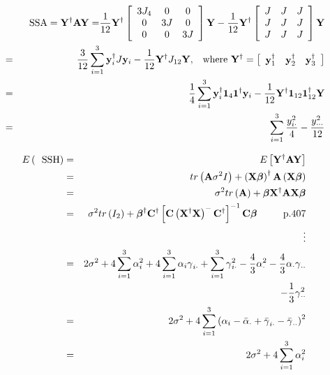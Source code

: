 \documentclass{article}
\begin{document}
\begin{eqnarray*}
&\therefore &\text{SSA}=\mathbf{Y}^{\dagger }\mathbf{AY=}\frac{1}{12}\mathbf{%
Y}^{\dagger }\left[ 
\begin{array}{ccc}
3J_{4} & 0 & 0 \\ 
0 & 3J & 0 \\ 
0 & 0 & 3J%
\end{array}%
\right] \mathbf{Y}-\frac{1}{12}\mathbf{Y}^{\dagger }\left[ 
\begin{array}{ccc}
J & J & J \\ 
J & J & J \\ 
J & J & J%
\end{array}%
\right] \mathbf{Y} \\
&=&\frac{3}{12}\sum\limits_{i=1}^{3}\mathbf{y}_{i}^{\dagger }J\mathbf{y}_{i}-%
\frac{1}{12}\mathbf{Y}^{\dagger }J_{12}\mathbf{Y,}\text{ where }\mathbf{Y}%
^{\dagger }=\left[ 
\begin{array}{ccc}
\mathbf{y}_{1}^{\dagger } & \mathbf{y}_{2}^{\dagger } & \mathbf{y}%
_{3}^{\dagger }%
\end{array}%
\right] \\
&=&\frac{1}{4}\sum\limits_{i=1}^{3}\mathbf{y}_{i}^{\dagger }\mathbf{1}_{4}%
\mathbf{1}^{\dagger }\mathbf{y}_{i}-\frac{1}{12}\mathbf{Y}^{\dagger }\mathbf{%
1}_{12}\mathbf{1}_{12}^{\dagger }\mathbf{Y} \\
&=&\sum\limits_{i=1}^{3}\frac{y_{i\cdot }^{2}}{4}-\frac{y_{\cdot \cdot \cdot
}^{2}}{12}
\end{eqnarray*}

\begin{eqnarray*}
E\left( \text{SSH}\right)  &=&E\left[ \mathbf{Y}^{\dagger }\mathbf{AY}\right]
\\
&=&tr\left( \mathbf{A}\sigma ^{2}I\right) +\left( \mathbf{X\beta }\right)
^{\dagger }\mathbf{A}\left( \mathbf{X\beta }\right)  \\
&=&\sigma ^{2}tr\left( \mathbf{A}\right) +\mathbf{\beta X^{\dagger }AX\beta }
\\
&=&\sigma ^{2}tr\left( I_{2}\right) +\mathbf{\beta }^{\dagger }\mathbf{C}%
^{\dagger }\left[ \mathbf{C}\left( \mathbf{X^{\dagger }X}\right) ^{-}\mathbf{%
C}^{\dagger }\right] ^{-1}\mathbf{C\beta \quad \quad }\text{p.407} \\
&&\vdots  \\
&=&2\sigma ^{2}+4\sum\limits_{i=1}^{3}\alpha
_{i}^{2}+4\sum\limits_{i=1}^{3}\alpha _{i}\gamma _{i\cdot
}+\sum\limits_{i=1}^{3}\gamma _{i\cdot }^{2}-\frac{4}{3}\alpha _{\cdot }^{2}-%
\frac{4}{3}\alpha _{\cdot }\gamma _{\cdot \cdot } \\
&&-\frac{1}{3}\gamma _{\cdot \cdot }^{2} \\
&=&2\sigma ^{2}+4\sum\limits_{i=1}^{3}\left( \alpha _{i}-\bar{\alpha}_{\cdot
}+\bar{\gamma}_{i\cdot }-\bar{\gamma}_{\cdot \cdot }\right) ^{2} \\
&=&2\sigma ^{2}+4\sum\limits_{i=1}^{3}\alpha _{i}^{2}
\end{eqnarray*}
\end{document}

